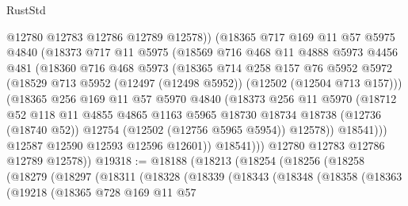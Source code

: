 \begin{lexlean}{RustStd}
\begin{coremodule}
                @12780
                @12783
                @12786
                @12789
                @12578))
            (@18365
              @717
              @169
              @11
              @57
              @5975
              @4840
              (@18373
                @717
                @11
                @5975
                (@18569
                  @716
                  @468
                  @11
                  @4888
                  @5973
                  @4456
                  @481
                  (@18360
                    @716
                    @468
                    @5973
                    (@18365
                      @714
                      @258
                      @157
                      @76
                      @5952
                      @5972
                      (@18529 @713 @5952 (@12497 (@12498 @5952)) (@12502 (@12504 @713 @157)))
                      (@18365
                        @256
                        @169
                        @11
                        @57
                        @5970
                        @4840
                        (@18373
                          @256
                          @11
                          @5970
                          (@18712
                            @52
                            @118
                            @11
                            @4855
                            @4865
                            @1163
                            @5965
                            @18730
                            @18734
                            @18738
                            (@12736 (@18740 @52))
                            @12754
                            (@12502 (@12756 @5965 @5954))
                            @12578))
                        @18541)))
                  @12587
                  @12590
                  @12593
                  @12596
                  @12601))
              @18541)))
        @12780
        @12783
        @12786
        @12789
        @12578))
@19318 := @18188
    (@18213
      (@18254
        (@18256
          (@18258
            (@18279
              (@18297
                (@18311
                  (@18328
                    (@18339
                      (@18343
                        (@18348
                          (@18358
                            (@18363
                              (@19218
                                (@18365
                                  @728
                                  @169
                                  @11
                                  @57

\end{coremodule}
\end{lexlean}
